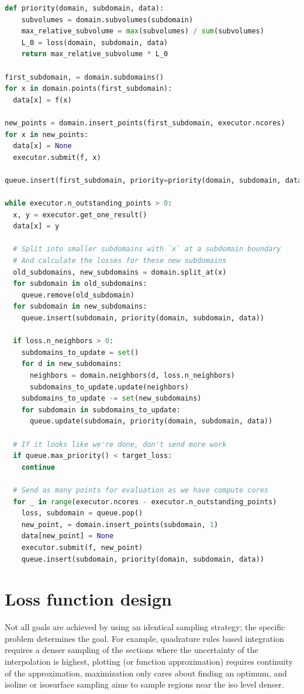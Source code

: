 \begin{lstlisting}[language=Python]
def priority(domain, subdomain, data):
    subvolumes = domain.subvolumes(subdomain)
    max_relative_subvolume = max(subvolumes) / sum(subvolumes)
    L_0 = loss(domain, subdomain, data)
    return max_relative_subvolume * L_0

first_subdomain, = domain.subdomains()
for x in domain.points(first_subdomain):
  data[x] = f(x)

new_points = domain.insert_points(first_subdomain, executor.ncores)
for x in new_points:
  data[x] = None
  executor.submit(f, x)

queue.insert(first_subdomain, priority=priority(domain, subdomain, data))

while executor.n_outstanding_points > 0:
  x, y = executor.get_one_result()
  data[x] = y

  # Split into smaller subdomains with `x` at a subdomain boundary
  # And calculate the losses for these new subdomains
  old_subdomains, new_subdomains = domain.split_at(x)
  for subdomain in old_subdomains:
    queue.remove(old_subdomain)
  for subdomain in new_subdomains:
    queue.insert(subdomain, priority(domain, subdomain, data))

  if loss.n_neighbors > 0:
    subdomains_to_update = set()
    for d in new_subdomains:
      neighbors = domain.neighbors(d, loss.n_neighbors)
      subdomains_to_update.update(neighbors)
    subdomains_to_update -= set(new_subdomains)
    for subdomain in subdomains_to_update:
      queue.update(subdomain, priority(domain, subdomain, data))

  # If it looks like we're done, don't send more work
  if queue.max_priority() < target_loss:
    continue

  # Send as many points for evaluation as we have compute cores
  for _ in range(executor.ncores - executor.n_outstanding_points)
    loss, subdomain = queue.pop()
    new_point, = domain.insert_points(subdomain, 1)
    data[new_point] = None
    executor.submit(f, new_point)
    queue.insert(subdomain, priority(domain, subdomain, data))
\end{lstlisting}

\section{Loss function design}


Not all goals are achieved by using an identical sampling strategy; the specific problem determines the goal.
For example, quadrature rules based integration requires a denser sampling of the sections where the uncertainty of the interpolation is highest, plotting (or function approximation) requires continuity of the approximation, maximization only cares about finding an optimum, and isoline or isosurface sampling aims to sample regions near the iso level denser.

